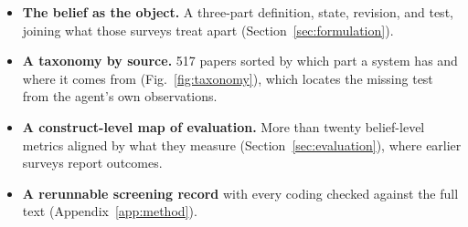 \begin{itemize}[leftmargin=*,nosep,topsep=2pt]
\item \textbf{The belief as the object.} A three-part definition, state, revision, and test, joining what those surveys treat apart (Section~\ref{sec:formulation}).
\item \textbf{A taxonomy by source.} 517 papers sorted by which part a system has and where it comes from (Fig.~\ref{fig:taxonomy}), which locates the missing test from the agent's own observations.
\item \textbf{A construct-level map of evaluation.} More than twenty belief-level metrics aligned by what they measure (Section~\ref{sec:evaluation}), where earlier surveys report outcomes.
\item \textbf{A rerunnable screening record} with every coding checked against the full text (Appendix~\ref{app:method}).
\end{itemize}\fi
